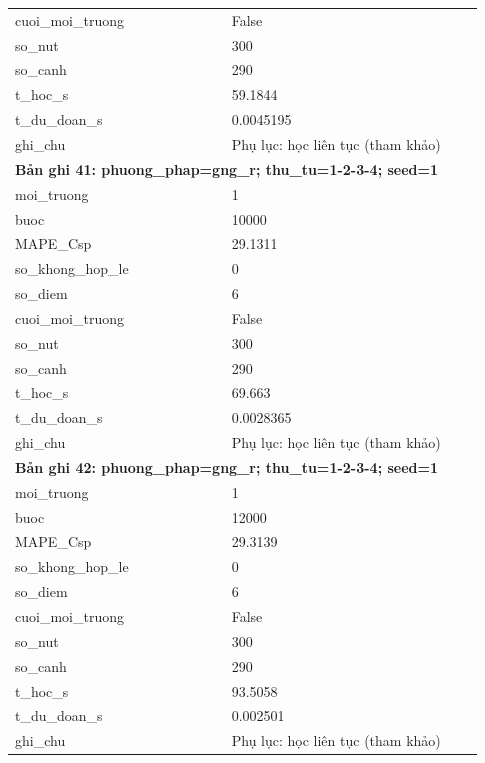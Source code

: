 \begin{longtable}{p{0.43\linewidth}p{0.50\linewidth}}
cuoi\_\allowbreak moi\_\allowbreak truong & False \\
so\_\allowbreak nut & 300 \\
so\_\allowbreak canh & 290 \\
t\_\allowbreak hoc\_\allowbreak s & 59.1844 \\
t\_\allowbreak du\_\allowbreak doan\_\allowbreak s & 0.0045195 \\
ghi\_\allowbreak chu & Phụ lục: học liên tục (tham khảo) \\
\midrule
\multicolumn{2}{p{0.95\linewidth}}{\textbf{Bản ghi 41: phuong\_phap=gng\_r; thu\_tu=1-2-3-4; seed=1}} \\
moi\_\allowbreak truong & 1 \\
buoc & 10000 \\
MAPE\_\allowbreak Csp & 29.1311 \\
so\_\allowbreak khong\_\allowbreak hop\_\allowbreak le & 0 \\
so\_\allowbreak diem & 6 \\
cuoi\_\allowbreak moi\_\allowbreak truong & False \\
so\_\allowbreak nut & 300 \\
so\_\allowbreak canh & 290 \\
t\_\allowbreak hoc\_\allowbreak s & 69.663 \\
t\_\allowbreak du\_\allowbreak doan\_\allowbreak s & 0.0028365 \\
ghi\_\allowbreak chu & Phụ lục: học liên tục (tham khảo) \\
\midrule
\multicolumn{2}{p{0.95\linewidth}}{\textbf{Bản ghi 42: phuong\_phap=gng\_r; thu\_tu=1-2-3-4; seed=1}} \\
moi\_\allowbreak truong & 1 \\
buoc & 12000 \\
MAPE\_\allowbreak Csp & 29.3139 \\
so\_\allowbreak khong\_\allowbreak hop\_\allowbreak le & 0 \\
so\_\allowbreak diem & 6 \\
cuoi\_\allowbreak moi\_\allowbreak truong & False \\
so\_\allowbreak nut & 300 \\
so\_\allowbreak canh & 290 \\
t\_\allowbreak hoc\_\allowbreak s & 93.5058 \\
t\_\allowbreak du\_\allowbreak doan\_\allowbreak s & 0.002501 \\
ghi\_\allowbreak chu & Phụ lục: học liên tục (tham khảo) \\

\end{longtable}

